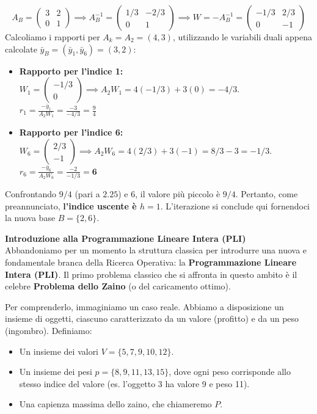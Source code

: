 \documentclass[12pt, a4paper]{article}
\begin{document}
	$$A_B = \begin{pmatrix} 3 & 2 \\ 0 & 1 \end{pmatrix} \implies A_B^{-1} = \begin{pmatrix} 1/3 & -2/3 \\ 0 & 1 \end{pmatrix} \implies W = -A_B^{-1} = \begin{pmatrix} -1/3 & 2/3 \\ 0 & -1 \end{pmatrix}$$
	Calcoliamo i rapporti per $A_k = A_2 = (4, 3)$, utilizzando le variabili duali appena calcolate $\bar{y}_B = (\bar{y}_1, \bar{y}_6) = (3, 2)$:
	\begin{itemize}[label=$\circ$, itemsep=2pt, leftmargin=1.5cm]
		\item \textbf{Rapporto per l'indice 1:} $W_1 = \begin{pmatrix} -1/3 \\ 0 \end{pmatrix} \implies A_2 W_1 = 4(-1/3) + 3(0) = -4/3$. \\
		$r_1 = \frac{-\bar{y}_1}{A_2 W_1} = \frac{-3}{-4/3} = \frac{9}{4}$
		
		\item \textbf{Rapporto per l'indice 6:} $W_6 = \begin{pmatrix} 2/3 \\ -1 \end{pmatrix} \implies A_2 W_6 = 4(2/3) + 3(-1) = 8/3 - 3 = -1/3$. \\
		$r_6 = \frac{-\bar{y}_6}{A_2 W_6} = \frac{-2}{-1/3} = \mathbf{6}$
	\end{itemize}
	Confrontando $9/4$ (pari a $2.25$) e $6$, il valore più piccolo è $9/4$. Pertanto, come preannunciato, \textbf{l'indice uscente è $h = 1$}. L'iterazione si conclude qui fornendoci la nuova base $B = \{2, 6\}$.
	
	\vspace{0.6cm}
	\textbf{Introduzione alla Programmazione Lineare Intera (PLI)}\\
	Abbandoniamo per un momento la struttura classica per introdurre una nuova e fondamentale branca della Ricerca Operativa: la \textbf{Programmazione Lineare Intera (PLI)}. Il primo problema classico che si affronta in questo ambito è il celebre \textbf{Problema dello Zaino} (o del caricamento ottimo).
	
	Per comprenderlo, immaginiamo un caso reale. Abbiamo a disposizione un insieme di oggetti, ciascuno caratterizzato da un valore (profitto) e da un peso (ingombro).
	Definiamo:
	\begin{itemize}[label=\textcolor{titlecolor}{\Large\textbullet}, itemsep=2pt, leftmargin=1.5cm]
		\item Un insieme dei valori $V = \{5, 7, 9, 10, 12\}$.
		\item Un insieme dei pesi $p = \{8, 9, 11, 13, 15\}$, dove ogni peso corrisponde allo stesso indice del valore (es. l'oggetto 3 ha valore 9 e peso 11).
		\item Una capienza massima dello zaino, che chiameremo $P$.
	\end{itemize}
	
\end{document}
